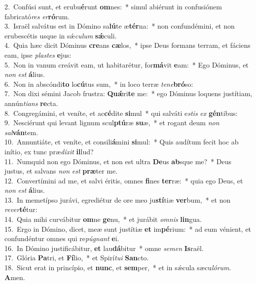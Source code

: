 {2.~}Confúsi sunt, et erubu\textbf{é}runt \textbf{om}nes:~* simul abiérunt in confusiónem fabricató\textit{res} \textit{er}\textbf{ró}rum.\\
{3.~}Israël salvátus est in Dómino sa\textbf{lú}te æ\textbf{tér}na:~* non confundémini, et non erubescétis usque in sǽ\textit{cu}\textit{lum} \textbf{sǽ}culi.\\
{4.~}Quia hæc dicit Dóminus \textbf{cre}ans \textbf{cæ}los,~* ipse Deus formans terram, et fáciens eam, ipse \textit{pla}\textit{stes} \textbf{e}jus:\\
{5.~}Non in vanum creávit eam, ut habitarétur, for\textbf{má}vit \textbf{e}am:~* Ego Dóminus, et \textit{non} \textit{est} \textbf{á}lius.\\
{6.~}Non in abscóndi\textbf{to} lo\textbf{cú}tus sum,~* in loco terræ \textit{te}\textit{ne}\textbf{bró}so:\\
{7.~}Non dixi sémini Jacob frustra: \textbf{Quǽ}ri\textbf{te} me:~* ego Dóminus loquens justítiam, annún\textit{ti}\textit{ans} \textbf{re}cta.\\
{8.~}Congregámini, et veníte, et ac\textbf{cé}dite \textbf{si}mul~* qui salváti e\textit{stis} \textit{ex} \textbf{gén}tibus:\\
{9.~}Nesciérunt qui levant lignum scul\textbf{ptú}ræ \textbf{su}æ,~* et rogant deum \textit{non} \textit{sal}\textbf{ván}tem.\\
{10.~}Annuntiáte, et veníte, et consili\textbf{á}mini \textbf{si}mul:~* Quis audítum fecit hoc ab inítio, ex tunc præ\textit{dí}\textit{xit} \textbf{il}lud?\\
{11.~}Numquid non ego Dóminus, et non est ultra \textbf{De}us \textbf{ab}sque me?~* Deus justus, et salvans \textit{non} \textit{est} \textbf{præ}ter me.\\
{12.~}Convertímini ad me, et salvi éritis, omnes \textbf{fi}nes \textbf{ter}ræ:~* quia ego Deus, et \textit{non} \textit{est} \textbf{á}lius.\\
{13.~}In memetípso jurávi, egrediétur de ore meo ju\textbf{stí}tiæ \textbf{ver}bum,~* et non \textit{re}\textit{ver}\textbf{té}tur:\\
{14.~}Quia mihi curvábitur \textbf{om}ne \textbf{ge}nu,~* et jurábit \textit{om}\textit{nis} \textbf{lin}gua.\\
{15.~}Ergo in Dómino, dicet, meæ sunt justítiæ \textbf{et} im\textbf{pé}rium:~* ad eum vénient, et confundéntur omnes qui re\textit{pú}\textit{gnant} \textbf{e}i.\\
{16.~}In Dómino justificábitur, \textbf{et} lau\textbf{dá}bitur~* omne \textit{se}\textit{men} \textbf{Is}raël.\\
{17.~}Glória \textbf{Pa}tri, et \textbf{Fí}lio,~* et Spirí\textit{tu}\textit{i} \textbf{San}cto.\\
{18.~}Sicut erat in princípio, et \textbf{nunc}, et \textbf{sem}per,~* et in sǽcula sæcu\textit{ló}\textit{rum}. \textbf{A}men.\\
